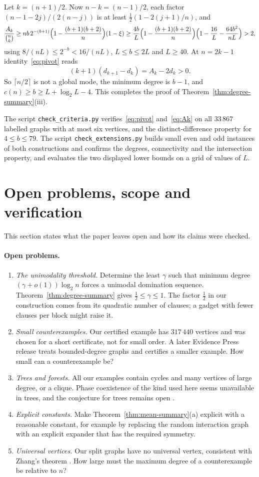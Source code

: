 \documentclass[11pt,a4paper]{article}
\theoremstyle{definition}
\theoremstyle{remark}
\begin{document}
Let $k=(n+1)/2$. Now $n-k=(n-1)/2$, each factor $(n-1-2j)/(2(n-j))$ is at least $\tfrac12(1-2(j+1)/n)$, and
\[
\frac{A_k}{\binom nk}\ge nb\,2^{-(b+1)}\Bigl(1-\frac{(b+1)(b+2)}n\Bigr)(1-\xi)\ge\frac{4b}{L}\Bigl(1-\frac{(b+1)(b+2)}n\Bigr)\Bigl(1-\frac{16}L-\frac{64b^2}{nL}\Bigr)>2,
\]
using $8/(nL)\le2^{-b}<16/(nL)$, $L\le b\le2L$ and $L\ge40$. At $n=2k-1$ identity~\eqref{eq:pivot} reads
\[
(k+1)(d_{k+1}-d_k)=A_k-2d_k>0 .
\]
So $\lceil n/2\rceil$ is not a global mode, the minimum degree is $b-1$, and $c(n)\ge b\ge L+\log_2L-4$. This completes the proof of Theorem~\ref{thm:degree-summary}(iii).

The script \texttt{check\_criteria.py} verifies~\eqref{eq:pivot} and~\eqref{eq:Ak} on all $33\,867$ labelled graphs with at most six vertices, and the distinct-difference property for $4\le b\le79$. The script \texttt{check\_extensions.py} builds small even and odd instances of both constructions and confirms the degrees, connectivity and the intersection property, and evaluates the two displayed lower bounds on a grid of values of $L$.

\section{Open problems, scope and verification}\label{sec:scope}
This section states what the paper leaves open and how its claims were checked.

\paragraph{Open problems.}
\begin{enumerate}[label=(\arabic*)]
\item \emph{The unimodality threshold.} Determine the least $\gamma$ such that minimum degree $(\gamma+o(1))\log_2n$ forces a unimodal domination sequence. Theorem~\ref{thm:degree-summary} gives $\tfrac12\le\gamma\le1$. The factor $\tfrac12$ in our construction comes from its quadratic number of clauses; a gadget with fewer clauses per block might raise it.
\item \emph{Small counterexamples.} Our certified example has $317\,440$ vertices and was chosen for a short certificate, not for small order. A later Evidence Press release treats bounded-degree graphs and certifies a smaller example. How small can a counterexample be?
\item \emph{Trees and forests.} All our examples contain cycles and many vertices of large degree, or a clique. Phase coexistence of the kind used here seems unavailable in trees, and the conjecture for trees remains open \cite{BS,DHP}.
\item \emph{Explicit constants.} Make Theorem~\ref{thm:mean-summary}(a) explicit with a reasonable constant, for example by replacing the random interaction graph with an explicit expander that has the required symmetry.
\item \emph{Universal vertices.} Our split graphs have no universal vertex, consistent with Zhang's theorem \cite{Zhang}. How large must the maximum degree of a counterexample be relative to $n$?
\end{enumerate}
\end{document}
